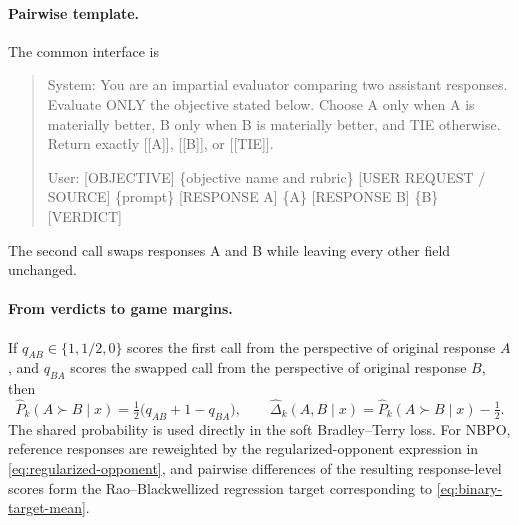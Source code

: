 \documentclass{article}
\theoremstyle{remark}
\theoremstyle{plain}
\newcommand{\NBPO}{\textsc{NBPO}}
\begin{document}
\paragraph{Pairwise template.}
The common interface is
\begin{quote}\small\ttfamily\raggedright\sloppy
System: You are an impartial evaluator comparing two assistant responses. Evaluate ONLY the objective stated below. Choose A only when A is materially better, B only when B is materially better, and TIE otherwise. Return exactly [[A]], [[B]], or [[TIE]].

User: [OBJECTIVE] \{objective name and rubric\} [USER REQUEST / SOURCE] \{prompt\} [RESPONSE A] \{A\} [RESPONSE B] \{B\} [VERDICT]
\end{quote}
The second call swaps responses A and B while leaving every other field unchanged.

\paragraph{From verdicts to game margins.}
If $q_{AB}\in\{1,1/2,0\}$ scores the first call from the perspective of original response $A$, and $q_{BA}$ scores the swapped call from the perspective of original response $B$, then
\[
\widehat P_k(A\succ B\mid x)
=\tfrac12\bigl(q_{AB}+1-q_{BA}\bigr),
\qquad
\widehat\Delta_k(A,B\mid x)
=\widehat P_k(A\succ B\mid x)-\tfrac12.
\]
The shared probability is used directly in the soft Bradley--Terry loss. For \NBPO{}, reference responses are reweighted by the regularized-opponent expression in \eqref{eq:regularized-opponent}, and pairwise differences of the resulting response-level scores form the Rao--Blackwellized regression target corresponding to \eqref{eq:binary-target-mean}.
\end{document}
